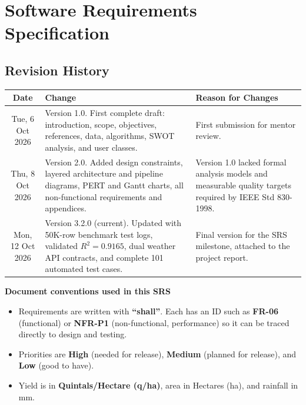 \documentclass[11pt,a4paper]{report}
\begin{document}
\part{Software Requirements Specification}

\chapter*{Revision History}

\begin{tabularx}{\textwidth}{|c|X|X|}
\hline
\textbf{Date} & \textbf{Change} & \textbf{Reason for Changes} \\
\hline
Tue, 6 Oct 2026 & Version 1.0. First complete draft: introduction, scope, objectives, references, data, algorithms, SWOT analysis, and user classes. & First submission for mentor review. \\
\hline
Thu, 8 Oct 2026 & Version 2.0. Added design constraints, layered architecture and pipeline diagrams, PERT and Gantt charts, all non-functional requirements and appendices. & Version 1.0 lacked formal analysis models and measurable quality targets required by IEEE Std 830-1998. \\
\hline
Mon, 12 Oct 2026 & Version 3.2.0 (current). Updated with 50K-row benchmark test logs, validated $R^2 = 0.9165$, dual weather API contracts, and complete 101 automated test cases. & Final version for the SRS milestone, attached to the project report. \\
\hline
\end{tabularx}

\vspace{10mm}
\noindent
\textbf{Document conventions used in this SRS}
\begin{itemize}
  \item Requirements are written with \textbf{``shall''}. Each has an ID such as \textbf{FR-06} (functional) or \textbf{NFR-P1} (non-functional, performance) so it can be traced directly to design and testing.
  \item Priorities are \textbf{High} (needed for release), \textbf{Medium} (planned for release), and \textbf{Low} (good to have).
  \item Yield is in \textbf{Quintals/Hectare (q/ha)}, area in Hectares (ha), and rainfall in mm.
\end{itemize}

\end{document}
